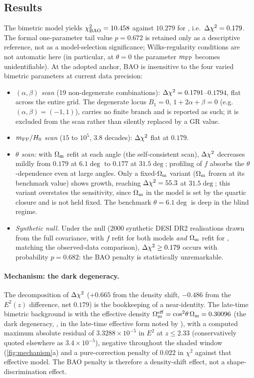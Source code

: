 \subsection{Results}\label{sec:baores}
The bimetric model yields $\chi^2_{\rm BAO}=10.458$ against $10.279$ for \LCDM{}, i.e.\ $\Delta\chi^2=0.179$. The formal one-parameter tail value $p=0.672$ is retained only as a descriptive reference, not as a model-selection significance; Wilks-regularity conditions are not automatic here (in particular, at $\theta=0$ the parameter $m_{\mathrm{FP}}$ becomes unidentifiable). At the adopted anchor, BAO is insensitive to the four varied bimetric parameters at current data precision:
\begin{itemize}
\item \emph{$(\alpha,\beta)$ scan} (19 non-degenerate combinations): $\Delta\chi^2=0.1791$--$0.1794$, flat across the entire grid. The degenerate locus $B_1=0$, $1+2\alpha+\beta=0$ (e.g.\ $(\alpha,\beta)=(-1,1)$), carries no finite branch and is reported as such; it is excluded from the scan rather than silently replaced by a GR value.
\item \emph{$m_{\mathrm{FP}}/H_0$ scan} ($15$ to $10^5$, 3.8 decades): $\Delta\chi^2$ flat at $0.179$.
\item \emph{$\theta$ scan:} with $\Omega_{\mathrm m}$ refit at each angle (the self-consistent scan), $\Delta\chi^2$ decreases mildly from $0.179$ at $6.1\deg$ to $0.177$ at $31.5\deg$; profiling of $f$ absorbs the $\theta$-dependence even at large angles. Only a fixed-$\Omega_{\mathrm m}$ variant ($\Omega_{\mathrm m}$ frozen at its benchmark value) shows growth, reaching $\Delta\chi^2=55.3$ at $31.5\deg$; this variant overstates the sensitivity, since $\Omega_{\mathrm m}$ in the model is set by the quartic closure and is not held fixed. The benchmark $\theta=6.1\deg$ is deep in the blind regime.
\item \emph{Synthetic null.} Under the \LCDM{} null (2000 synthetic DESI DR2 realisations drawn from the full covariance, with $f$ refit for both models \emph{and} $\Omega_{\mathrm m}$ refit for \LCDM{}, matching the observed-data comparison), $\Delta\chi^2\ge0.179$ occurs with probability $p=0.682$: the BAO penalty is statistically unremarkable.
\end{itemize}

\paragraph{Mechanism: the dark degeneracy.}
The decomposition of $\Delta\chi^2$ ($+0.665$ from the density shift, $-0.486$ from the $E^2(z)$ difference, net $0.179$) is the bookkeeping of a near-identity. The late-time bimetric background is \LCDM{} with the effective density $\Omega_{\mathrm m}^{\rm eff}=\cos^2\!\theta\,\Omega_{\mathrm m}=0.30096$ (the dark degeneracy, \citealp{Kunz2009}, in the late-time effective form noted by \citealp{Hogas2021}), with a computed maximum absolute residual of $3.3288\times10^{-5}$ in $E^2$ at $z\le2.33$ (conservatively quoted elsewhere as $3.4\times10^{-5}$), negative throughout the shaded window (\cref{fig:mechanism}a) and a pure-correction penalty of $0.022$ in $\chi^2$ against that effective model. The BAO penalty is therefore a density-shift effect, not a shape-discrimination effect.

